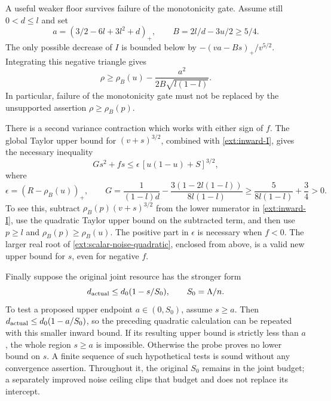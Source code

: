 A useful weaker floor survives failure of the monotonicity gate.
Assume still $0<d\le l$ and set
\[
 a=(3/2-6l+3l^2+d)_+,
 \qquad B=2l/d-3u/2\ge5/4.
\]
The only possible decrease of $I$ is bounded below by
$-(va-Bs)_+/v^{5/2}$. Integrating this negative triangle gives
\begin{equation}\label{ext:inward-deficit}
 \rho\ge\rho_B(u)-\frac{a^2}{2B\sqrt{l(1-l)}}.
\end{equation}
In particular, failure of the monotonicity gate must not be replaced
by the unsupported assertion $\rho\ge\rho_B(p)$.

There is a second variance contraction which works with either sign
of $f$. The global Taylor upper bound for $(v+s)^{3/2}$, combined
with \eqref{ext:inward-I}, gives the necessary inequality
\begin{equation}\label{ext:scalar-noise-quadratic}
 Gs^2+fs\le\epsilon\,[u(1-u)+S]^{3/2},
\end{equation}
where
\[
 \epsilon=(R-\rho_B(u))_+,\qquad
 G=\frac1{(1-l)d}-\frac{3(1-2l(1-l))}{8l(1-l)}
       \ge\frac5{8l(1-l)}+\frac34>0.
\]
To see this, subtract $\rho_B(p)(v+s)^{3/2}$ from the lower
numerator in \eqref{ext:inward-I}, use the quadratic Taylor upper
bound on the subtracted term, and then use $p\ge l$ and
$\rho_B(p)\ge\rho_B(u)$. The positive part in $\epsilon$ is
necessary when $f<0$. The larger real root of
\eqref{ext:scalar-noise-quadratic}, enclosed from above, is a valid
new upper bound for $s$, even for negative $f$.

Finally suppose the original joint resource has the stronger form
\[
 d_{\rm actual}\le d_0(1-s/S_0),\qquad S_0=\Lambda/n.
\]
To test a proposed upper endpoint $a\in(0,S_0)$, assume $s\ge a$.
Then $d_{\rm actual}\le d_0(1-a/S_0)$, so the preceding quadratic
calculation can be repeated with this smaller inward bound. If its
resulting upper bound is strictly less than $a$, the whole region
$s\ge a$ is impossible. Otherwise the probe proves no lower bound
on $s$. A finite sequence of such hypothetical tests is sound
without any convergence assertion. Throughout it, the original
$S_0$ remains in the joint budget; a separately improved noise
ceiling clips that budget and does not replace its intercept.
